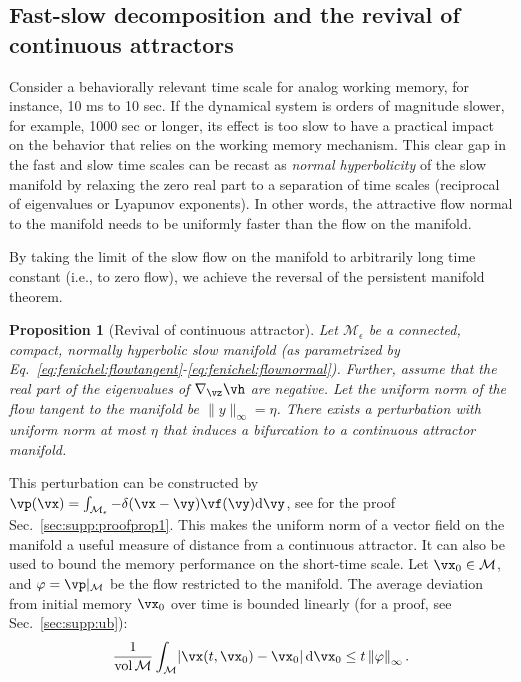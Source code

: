 \documentclass{article} %
\newcounter{ct}
\newcommand{\dm}[1]{\ensuremath{\mathrm{d}{#1}}} %
\newcommand{\manifold}{\mathcal{M}}
\newcommand{\uniformNorm}[1]{\left\|#1\right\|_\infty} %
\DeclarePairedDelimiter{\abs}{\lvert}{\rvert}
\newtheorem{prop}{Proposition}
\theoremstyle{definition}
\theoremstyle{remark}
\begin{document}
\subsection{Fast-slow decomposition and the revival of continuous attractors}\label{sec:revival}
Consider a behaviorally relevant time scale for analog working memory, for instance, 10 ms to 10 sec.
If the dynamical system is orders of magnitude slower, for example, 1000 sec or longer, its effect is too slow to have a practical impact on the behavior that relies on the working memory mechanism.
This clear gap in the fast and slow time scales can be recast as \emph{normal hyperbolicity} of the slow manifold by relaxing the zero real part to a separation of time scales (reciprocal of eigenvalues or Lyapunov exponents).
In other words, the attractive flow normal to the manifold needs to be uniformly faster than the flow on the manifold.

By taking the limit of the slow flow on the manifold to arbitrarily long time constant (i.e., to zero flow), we achieve the reversal of the persistent manifold theorem.
\begin{prop}[Revival of continuous attractor]\label{prop:revival}
Let \(\manifold_\epsilon\) be a connected, compact, normally hyperbolic slow manifold  (as parametrized by Eq.~\eqref{eq:fenichel:flowtangent}-\eqref{eq:fenichel:flownormal}).
Further, assume that the real part of the eigenvalues of \(\nabla_\vz \vh\) are negative. %
Let the uniform norm of the flow tangent to the manifold be \(\|y\|_\infty=\eta\).
There exists a perturbation with uniform norm at most \(\eta\) that induces a bifurcation to a continuous attractor manifold. %
\end{prop}

This perturbation can be constructed by \(\vp(\vx) = \int_{\manifold_\epsilon} - \delta(\vx-\vy)\vf(\vy)\dm{\vy}\), see for the proof Sec.~\ref{sec:supp:proofprop1}.
This makes the uniform norm of a vector field on the manifold a useful measure of distance from a continuous attractor.
It can also be used to bound the memory performance on the short-time scale. %
Let \(\vx_0 \in \manifold\), and \(\varphi = \vp\vert_\manifold\) be the flow restricted to the manifold.
The average deviation from initial memory \(\vx_0\) over time is bounded linearly (for a proof, see Sec.~\ref{sec:supp:ub}):
\begin{align}\label{eq:distance:ub}
\frac{1}{\operatorname{vol}\manifold}\int_\manifold
\abs{\vx(t, \vx_0) - \vx_0}\,
\dm{\vx_0}
\leq t\uniformNorm{\varphi}.
\end{align}
\end{document}
